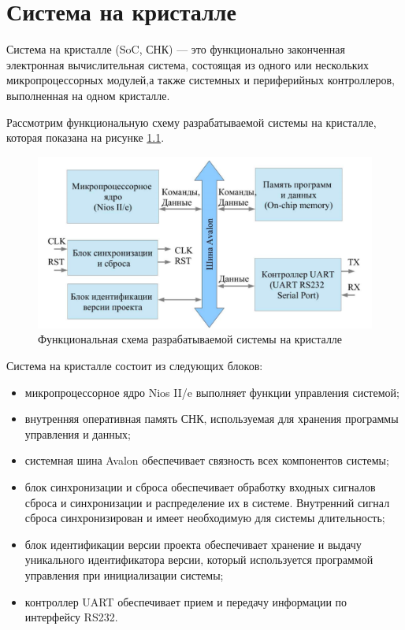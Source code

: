 \chapter{Система на кристалле}

Система на кристалле  (SoC,  СНК)  — это функционально законченная электронная вычислительная система, состоящая из одного или нескольких микропроцессорных модулей,а также системных и периферийных контроллеров, выполненная на одном кристалле.

Рассмотрим функциональную схему разрабатываемой системы на кристалле, которая показана на рисунке \ref{img:scheme}.

\begin{figure}[H]
	\begin{center}
		\includegraphics[scale=0.3]{img/scheme.png}
	\end{center}
	\captionsetup{justification=centering}
	\caption{Функциональная схема разрабатываемой системы на кристалле}
	\label{img:scheme}
\end{figure}

Система на кристалле состоит из следующих блоков:
\begin{itemize}
	\item микропроцессорное ядро Nios II/e выполняет функции управления системой;
	\item внутренняя оперативная память СНК, используемая для хранения программы управления и данных;
	\item системная шина Avalon обеспечивает связность всех компонентов системы;
	\item блок синхронизации и сброса обеспечивает обработку входных сигналов сброса и синхронизации и распределение их в системе. Внутренний сигнал сброса синхронизирован и имеет необходимую для системы длительность;
	\item блок идентификации версии проекта обеспечивает хранение и выдачу уникального идентификатора версии, который используется программой управления при инициализации системы;
	\item контроллер UART обеспечивает прием и передачу информации по интерфейсу RS232.
\end{itemize}

